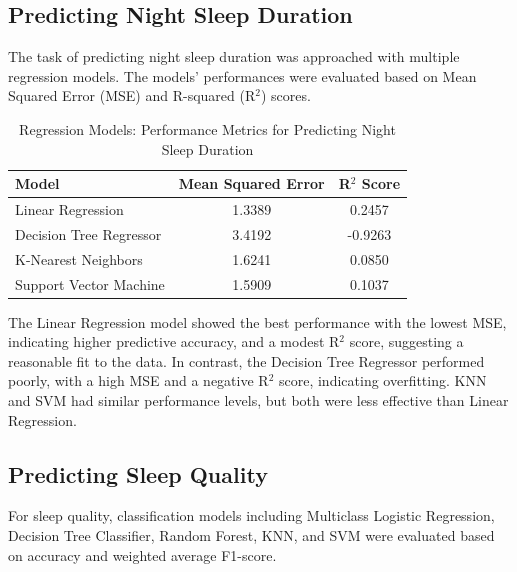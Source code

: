 \documentclass[conference]{IEEEtran}
\begin{document}
\subsection{Predicting Night Sleep Duration}
The task of predicting night sleep duration was approached with multiple regression models. The models' performances were evaluated based on Mean Squared Error (MSE) and R-squared (R\(^2\)) scores.

\begin{table}[ht]
    \centering
    \caption{Regression Models: Performance Metrics for Predicting Night Sleep Duration}
    \label{tab:regression-models}
    \begin{tabular}{|l|c|c|}
        \hline
        \textbf{Model}          & \textbf{Mean Squared Error} & \textbf{R\(^2\) Score} \\
        \hline
        Linear Regression       & 1.3389                      & 0.2457                 \\
        Decision Tree Regressor & 3.4192                      & -0.9263                \\
        K-Nearest Neighbors     & 1.6241                      & 0.0850                 \\
        Support Vector Machine  & 1.5909                      & 0.1037                 \\
        \hline
    \end{tabular}
\end{table}

The Linear Regression model showed the best performance with the lowest MSE, indicating higher predictive accuracy, and a modest R\(^2\) score, suggesting a reasonable fit to the data. In contrast, the Decision Tree Regressor performed poorly, with a high MSE and a negative R\(^2\) score, indicating overfitting. KNN and SVM had similar performance levels, but both were less effective than Linear Regression.

\subsection{Predicting Sleep Quality}
For sleep quality, classification models including Multiclass Logistic Regression, Decision Tree Classifier, Random Forest, KNN, and SVM were evaluated based on accuracy and weighted average F1-score.
\end{document}
